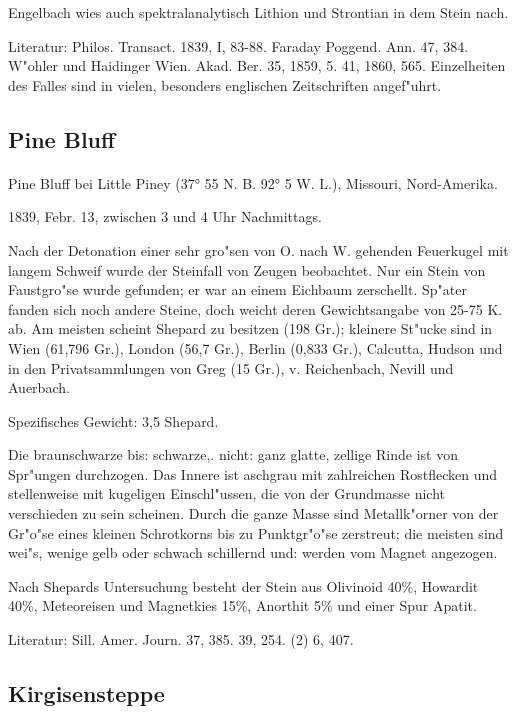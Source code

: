 \documentclass[a4paper, 11pt, oneside]{article}
\begin{document}
Engelbach wies auch spektralanalytisch Lithion und Strontian in dem Stein nach.

\footnotesize
Literatur: Philos. Transact. 1839, I, 83-88. Faraday Poggend. Ann. 47, 384. W"ohler und Haidinger Wien. Akad. Ber. 35, 1859, 5. 41, 1860, 565. Einzelheiten des Falles sind in vielen, besonders englischen Zeitschriften angef"uhrt.

\subsection{Pine Bluff}
\normalsize
\paragraph{}
Pine Bluff bei Little Piney (37° 55 N. B. 92° 5 W. L.), Missouri, Nord-Amerika.

1839, Febr. 13, zwischen 3 und 4 Uhr Nachmittags.

Nach der Detonation einer sehr gro"sen von O. nach W. gehenden Feuerkugel mit langem Schweif wurde der Steinfall von Zeugen beobachtet. Nur ein Stein von Faustgro"se wurde gefunden; er war an einem Eichbaum zerschellt. Sp"ater fanden sich noch andere Steine, doch weicht deren Gewichtsangabe von 25-75 K. ab. Am meisten scheint Shepard zu besitzen (198 Gr.); kleinere St"ucke sind in Wien (61,796 Gr.), London (56,7 Gr.), Berlin (0,833 Gr.), Calcutta, Hudson und in den Privatsammlungen von Greg (15 Gr.), v. Reichenbach, Nevill und Auerbach.

Spezifisches Gewicht: 3,5 Shepard.

Die braunschwarze bis: schwarze,. nicht: ganz glatte, zellige Rinde ist von Spr"ungen durchzogen. Das Innere ist aschgrau mit zahlreichen Rostflecken und stellenweise mit kugeligen Einschl"ussen, die von der Grundmasse nicht verschieden zu sein scheinen. Durch die ganze Masse sind Metallk"orner von der Gr"o"se eines kleinen Schrotkorns bis zu Punktgr"o"se zerstreut; die meisten sind wei"s, wenige gelb oder schwach schillernd und: werden vom Magnet angezogen.

Nach Shepards Untersuchung besteht der Stein aus Olivinoid 40\%, Howardit 40\%, Meteoreisen und Magnetkies 15\%, Anorthit 5\% und einer Spur Apatit.

\footnotesize
Literatur: Sill. Amer. Journ. 37, 385. 39, 254. (2) 6, 407.

\subsection{Kirgisensteppe}
\normalsize
\end{document}
